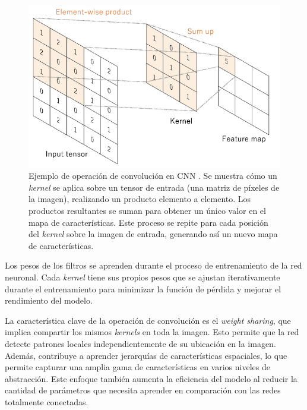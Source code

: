 \begin{figure}[h]
	\centering
	\includegraphics[scale=0.75]{imagenes/cap2/convolution.png}
	\caption[Ejemplo de operación de convolución.]{Ejemplo de operación de convolución en CNN \cite{40}. Se muestra cómo un \textit{kernel} se aplica sobre un tensor de entrada (una matriz de píxeles de la imagen), realizando un producto elemento a elemento. Los productos resultantes se suman para obtener un único valor en el mapa de características. Este proceso se repite para cada posición del \textit{kernel} sobre la imagen de entrada, generando así un nuevo mapa de características.}
	\label{fig7}
\end{figure}

Los pesos de los filtros se aprenden durante el proceso de entrenamiento de la red neuronal. Cada \textit{kernel} tiene sus propios pesos que se ajustan iterativamente durante el entrenamiento para minimizar la función de pérdida y mejorar el rendimiento del modelo.

La característica clave de la operación de convolución es el \textit{weight sharing}, que implica compartir los mismos \textit{kernels} en toda la imagen. Esto permite que la red detecte patrones locales independientemente de su ubicación en la imagen. Además, contribuye a aprender jerarquías de características espaciales, lo que permite capturar una amplia gama de características en varios niveles de abstracción. Este enfoque también aumenta la eficiencia del modelo al reducir la cantidad de parámetros que necesita aprender en comparación con las redes totalmente conectadas.

